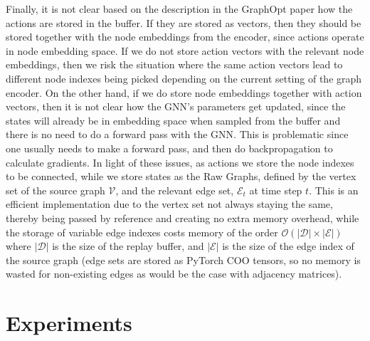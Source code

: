 \documentclass{report}
\numberwithin{equation}{section}
\numberwithin{figure}{section}
\numberwithin{table}{section}
\numberwithin{algorithm}{section}
\begin{document}
Finally, it is not clear based on the description in the GraphOpt 
paper how the actions are stored in the buffer. If they are stored 
as vectors, then they should be stored together with the node 
embeddings from the encoder, since actions operate in node embedding 
space. If we do not store action vectors with the relevant 
node embeddings, then we risk the situation where the same 
action vectors lead to different node indexes being picked 
depending on the current setting of the graph encoder. On the 
other hand, if we do store node embeddings together with action 
vectors, then it is not clear how the GNN's parameters get updated, 
since the states will already be in embedding space when sampled 
from the buffer and there is no need to do a forward 
pass with the GNN. This is problematic since one usually needs 
to make a forward pass, and then do 
backpropagation \citep{backprop} to calculate gradients. In light 
of these issues, as actions we store the node indexes to 
be connected, while we store states as the Raw Graphs, 
defined by the  
vertex set of the source graph $\mathcal{V}$, and the relevant 
edge set, $\mathcal{E}_t$ at time step $t$. This is an efficient 
implementation due to the vertex set not always staying the same, 
thereby being passed by reference and creating no extra memory 
overhead, while the storage of variable edge indexes costs 
memory of the order $\mathcal{O}(|\mathcal{D}|\times |\mathcal{E}|)$ 
where $|\mathcal{D}|$ is the size of the replay buffer, and 
$|\mathcal{E}|$ is the size of the edge index of the source graph 
(edge sets are stored as PyTorch COO tensors, so no memory is 
wasted for non-existing edges as would be the case with adjacency 
matrices). 


\chapter{Experiments}\label{chap:experiments}


\end{document}
